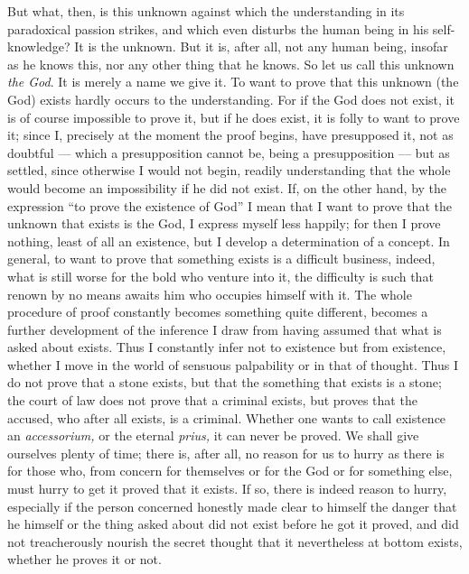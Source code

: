 \documentclass[12pt,a4paper,openany]{book}
\newcommand{\opage}[1]{\marginnote{\footnotesize\textit{[#1]}}}
\begin{document}
But what, then, is this unknown against which the understanding in its paradoxical passion strikes, and which even disturbs the human being in his self-knowledge? It is
the unknown. But it is, after all, not any human being, insofar as he knows this, nor
any other thing that he knows. So let us call this unknown \emph{the God}. It is
merely a name we give it. To want to prove that this unknown (the God) exists hardly
occurs to the understanding. For if the God does not exist, it is of course
impossible to prove it, but if he does exist, it is folly to want to prove it; since I,
precisely at the moment the proof begins, have presupposed it, not as doubtful ---
which a presupposition cannot be, being a presupposition --- but as settled, since
otherwise I would not begin, readily understanding that the whole would become an
impossibility if he did not exist. If, on the other hand, by the expression ``to prove
the existence of God'' I mean that I want to prove that the unknown that exists is the
God, I express myself less happily; for then I prove nothing, least of all an
existence, but I develop a determination of a concept. In general, to
\setcounter{footnote}{0}%
\opage{166}want to prove that something exists is a difficult business, indeed, what is still
worse for the bold who venture into it, the difficulty is such that renown by no
means awaits him who occupies himself with it. The whole procedure of proof constantly
becomes something quite different, becomes a further development of the inference I
draw from having assumed that what is asked about exists. Thus I constantly infer not
to existence but from existence, whether I move in the world of sensuous palpability
or in that of thought. Thus I do not prove that a stone exists, but that the something
that exists is a stone; the court of law does not prove that a criminal exists, but
proves that the accused, who after all exists, is a criminal. Whether one wants to
call existence an \textit{accessorium,} or the eternal \textit{prius,} it can never be
proved. We shall give ourselves plenty of time; there is, after all, no reason for us
to hurry as there is for those who, from concern for themselves or for the God or for
something else, must hurry to get it proved that it exists. If so, there is indeed
reason to hurry, especially if the person concerned honestly made clear to himself
the danger that he himself or the thing asked about did not exist before he got it
proved, and did not treacherously nourish the secret thought that it nevertheless at
bottom exists, whether he proves it or not.
\end{document}

